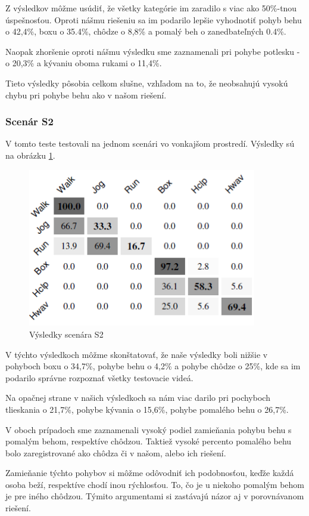Z výsledkov môžme usúdiť, že všetky kategórie im zaradilo s viac ako 50\%-tnou úspešnosťou. 
Oproti nášmu riešeniu sa im podarilo lepšie vyhodnotiť pohyb behu o 42,4\%,  boxu o 35.4\%, chôdze o 8,8\% a pomalý beh o zanedbateľných 0.4\%.

Naopak zhoršenie oproti nášmu výsledku sme zaznamenali pri pohybe potlesku - o 20,3\% a kývaniu oboma rukami o 11,4\%.

Tieto výsledky pôsobia celkom slušne, vzhľadom na to, že neobsahujú vysokú chybu pri pohybe behu ako v našom riešení.


\subsubsection{Scenár S2}
V tomto teste testovali na jednom scenári vo vonkajšom prostredí. Výsledky sú na obrázku \ref{cmp2}. 

\begin{figure}[H]
  \centering
  \includegraphics[width=10cm]{img/cmpLFSVM2.png}
  \caption{Výsledky scenára S2}
  \label{cmp2}
\end{figure}  

V týchto výsledkoch môžme skonštatovať, že naše výsledky boli nižšie v pohyboch boxu o 34,7\%, pohybe behu o 4,2\% a pohybe chôdze o 25\%, kde sa im podarilo správne rozpoznať všetky testovacie videá.

Na opačnej strane v našich výsledkoch sa nám viac darilo pri pochyboch tlieskania o 21,7\%, pohybe kývania o 15,6\%, pohybe pomalého behu o 26,7\%. 

V oboch prípadoch sme zaznamenali vysoký podiel zamieňania pohybu behu s pomalým behom, respektíve chôdzou. Taktiež vysoké percento pomalého behu bolo zaregistrované ako chôdza či v našom, alebo ich riešení. 

Zamieňanie týchto pohybov si môžme odôvodniť ich podobnosťou, keďže každá osoba beží, respektíve chodí inou rýchlosťou. To, čo je u niekoho pomalým behom je pre iného chôdzou. Týmito argumentami si zastávajú názor aj v porovnávanom riešení. 

